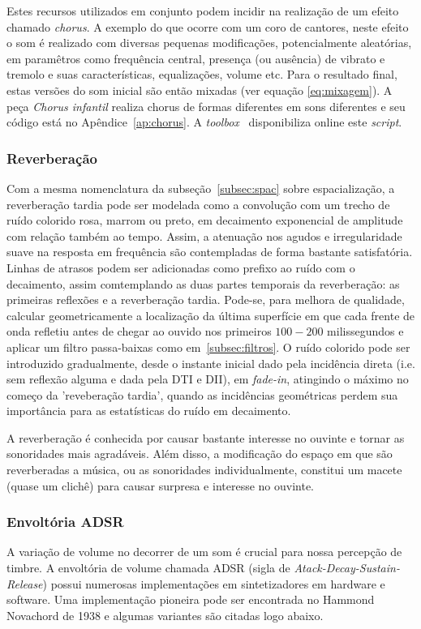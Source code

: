Estes recursos utilizados em conjunto podem incidir na realização de um efeito chamado \emph{chorus}. A
exemplo do que ocorre com um coro de cantores, neste efeito o som é realizado com diversas pequenas modificações,
potencialmente aleatórias, em paramêtros como frequência central, presença (ou ausência) de vibrato
e tremolo e suas características, equalizações, volume etc. Para o resultado final, estas versões do som
inicial são então mixadas (ver equação \ref{eq:mixagem}). A peça \emph{Chorus infantil} realiza chorus de formas
diferentes em sons diferentes e seu código está no Apêndice~\ref{ap:chorus}. A \emph{toolbox} \massa\ disponibiliza online este \emph{script}.

\subsubsection{Reverberação}\label{subsubsec:reverb}
Com a mesma nomenclatura da subseção~\ref{subsec:spac} sobre espacialização, a reverberação tardia pode ser modelada como a convolução com um trecho de ruído colorido rosa, marrom ou preto, em decaimento exponencial de amplitude com relação também ao tempo. Assim, a atenuação nos agudos e irregularidade suave na resposta em frequência são contempladas de forma bastante satisfatória.\cite{JOSPhy,guillaume} Linhas de atrasos podem ser adicionadas como prefixo ao ruído com o decaimento, assim comtemplando as duas partes temporais da reverberação: as primeiras reflexões e a reverberação tardia. Pode-se, para melhora de qualidade, calcular geometricamente a localização da última superfície em que cada frente de onda refletiu antes de chegar ao ouvido nos primeiros $100-200$ milissegundos e aplicar um filtro passa-baixas como em~\ref{subsec:filtros}. O ruído colorido pode ser introduzido gradualmente, desde o instante inicial dado pela incidência direta (i.e. sem reflexão alguma e dada pela DTI e DII), em \emph{fade-in}, atingindo o máximo no começo da 'reveberação tardia', quando as incidências geométricas perdem sua importância para as estatísticas do ruído em decaimento.

A reverberação é conhecida por causar bastante interesse no ouvinte e tornar as sonoridades mais agradáveis. Além disso, a modificação do espaço em que são reverberadas a música, ou as sonoridades individualmente, constitui um macete (quase um clichê) para causar surpresa e interesse no ouvinte. 



\subsubsection{Envoltória ADSR}
A variação de volume no decorrer de um som é crucial para nossa percepção de timbre. A envoltória de volume chamada ADSR (sigla de \emph{Atack-Decay-Sustain-Release}) possui numerosas implementações em sintetizadores em hardware e software. Uma implementação pioneira pode ser encontrada no Hammond Novachord de 1938 e algumas variantes são citadas logo abaixo.\cite{ADSR}

